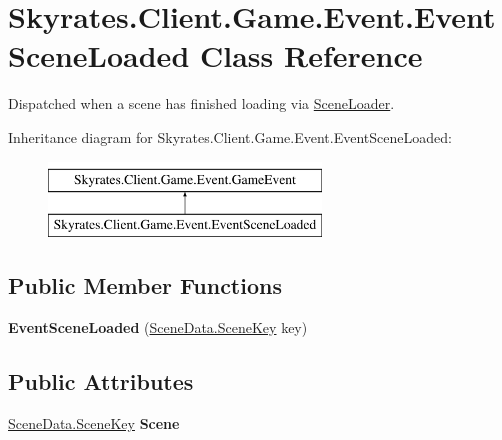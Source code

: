 \hypertarget{class_skyrates_1_1_client_1_1_game_1_1_event_1_1_event_scene_loaded}{\section{Skyrates.\-Client.\-Game.\-Event.\-Event\-Scene\-Loaded Class Reference}
\label{class_skyrates_1_1_client_1_1_game_1_1_event_1_1_event_scene_loaded}
}


Dispatched when a scene has finished loading via \hyperlink{class_scene_loader}{Scene\-Loader}.  


Inheritance diagram for Skyrates.\-Client.\-Game.\-Event.\-Event\-Scene\-Loaded\-:\begin{figure}[H]
\begin{center}
\leavevmode
\includegraphics[height=2.000000cm]{class_skyrates_1_1_client_1_1_game_1_1_event_1_1_event_scene_loaded}
\end{center}
\end{figure}
\subsection*{Public Member Functions}
\begin{DoxyCompactItemize}
\item 
\hypertarget{class_skyrates_1_1_client_1_1_game_1_1_event_1_1_event_scene_loaded_a626a0f186114b9ebd5684238e1157319}{{\bfseries Event\-Scene\-Loaded} (\hyperlink{class_scene_data_a79d397b3deef242a865470283d96f2e6}{Scene\-Data.\-Scene\-Key} key)}\label{class_skyrates_1_1_client_1_1_game_1_1_event_1_1_event_scene_loaded_a626a0f186114b9ebd5684238e1157319}

\end{DoxyCompactItemize}
\subsection*{Public Attributes}
\begin{DoxyCompactItemize}
\item 
\hypertarget{class_skyrates_1_1_client_1_1_game_1_1_event_1_1_event_scene_loaded_af842f8c33a313b1eee1e07ab89816d61}{\hyperlink{class_scene_data_a79d397b3deef242a865470283d96f2e6}{Scene\-Data.\-Scene\-Key} {\bfseries Scene}}\label{class_skyrates_1_1_client_1_1_game_1_1_event_1_1_event_scene_loaded_af842f8c33a313b1eee1e07ab89816d61}

\end{DoxyCompactItemize}


